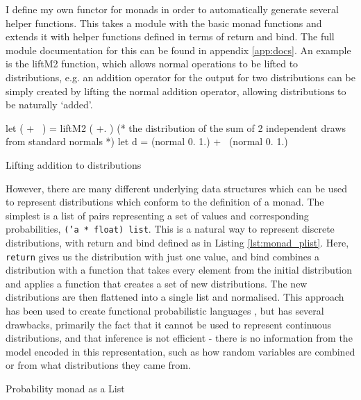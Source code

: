 \documentclass[sigconf]{acmart}
\begin{document}
I define my own functor for monads in order to automatically generate several helper functions. This takes a module with the basic monad functions and extends it with helper functions defined in terms of return and bind. The full module documentation for this can be found in appendix \ref{app:docs}. An example is the liftM2 function, which allows normal operations to be lifted to distributions, e.g. an addition operator for the output for two distributions can be simply created by lifting the normal addition operator, allowing distributions to be naturally `added'.

\begin{listing}
  \begin{ocamlcode-in}
    let ( +~ ) = liftM2 ( +. )
    (* the distribution of the sum of 2 independent draws from standard normals *)
    let d = (normal 0. 1.) +~ (normal 0. 1.)
  \end{ocamlcode-in}
  \caption{Lifting addition to distributions}
\end{listing}

However, there are many different underlying data structures which can be used to represent distributions which conform to the definition of a monad. The simplest is a list of pairs representing a set of values and corresponding probabilities, \texttt{('a * float) list}. This is a natural way to represent discrete distributions, with return and bind defined as in Listing \ref{lst:monad_plist}. Here, \texttt{return} gives us the distribution with just one value, and bind combines a distribution with a function that takes every element from the initial distribution and applies a function that creates a set of new distributions. The new distributions are then flattened into a single list and normalised. This approach has been used to create functional probabilistic languages \cite{erwig}, but has several drawbacks, primarily the fact that it cannot be used to represent continuous distributions, and that inference is not efficient - there is no information from the model encoded in this representation, such as how random variables are combined or from what distributions they came from.

\begin{listing}[!ht]
  \caption{Probability monad as a List}
  \label{lst:monad_plist}
\end{listing}
\end{document}
